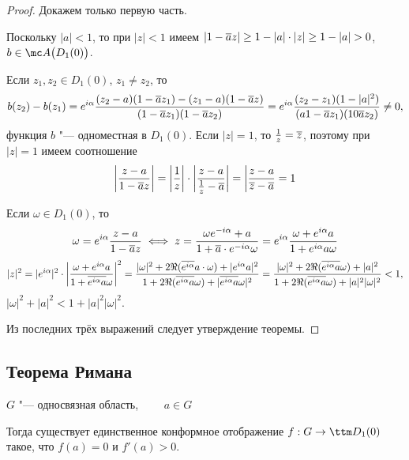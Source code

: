 \begin{proof}
	Докажем только первую часть.

	Поскольку $ |a| < 1 $, то при $ |z| < 1 $ имеем $ |1 - \overline az| \ge 1 - |a| \cdot |z| \ge 1 - |a| > 0 $, \ie $ b \in \mc A \big( D_1(0) \big) $.

	Если $ z_1, z_2 \in D_1(0) $, $ z_1 \ne z_2 $, то
	$$ b(z_2) - b(z_1) = e^{i\alpha} \frac{(z_2 - a)(1 - \overline a z_1) - (z_1 - a)(1 - \overline az)}{(1 - \overline az_1)(1 - \overline az_2)} = e^{i\alpha} \frac{(z_2 - z_1)(1 - |a|^2)}{(a1 - \overline az_1)(1 0 \overline az_2)} \ne 0, $$
	\ie функция $ b $ "--- одноместная в $ D_1(0) $. Если $ |z| = 1 $, то $ \frac1z = \overline z $, поэтому при $ |z| = 1 $ имеем соотношение
	$$ \bigg| \frac{z - a}{1 - \overline az} \bigg| = \bigg| \frac1z \bigg| \cdot \bigg| \frac{z - a}{\frac1z - \overline a} \bigg| = \bigg| \frac{z - a}{\overline z - \overline a} = 1 $$

	Если $ \omega \in D_1(0) $, то
	$$ \omega = e^{i\alpha} \frac{z - a}{1 - \overline az} \iff z = \frac{\omega e^{-i\alpha} + a}{1 + \overline a \cdot e^{-i\alpha}\omega} = e^{i\alpha} \frac{\omega + e^{i\alpha}a}{1 + e^{i\alpha}a\omega} $$
	$$ |z|^2 = |e^{i\alpha}|^2 \cdot \bigg| \frac{\omega + e^{i\alpha}a}{1 + \overline{e^{i\alpha}a}\omega } \bigg|^2 = \frac{|\omega|^2 + 2 \Re( \overline{e^{i\alpha}}a \cdot \omega) + |e^{i\alpha}a|^2}{1 + 2 \Re(\overline{e^{i\alpha}a}\omega) + |\overline{e^{i\alpha}a}\omega|^2} = \frac{|\omega|^2 + 2\Re(\overline{e^{i\alpha}a}\omega) + |a|^2}{1 + 2\Re(\overline{e^{i\alpha}a}\omega) + |a|^2|\omega|^2} < 1, $$
	\as $ |\omega|^2 + |a|^2 < 1 + |a|^2|\omega|^2 $.

	Из последних трёх выражений следует утверждение теоремы.
\end{proof}

\subsection{Теорема Римана}

\begin{theorem}
	$ G $ "--- односвязная область, $ \qquad a \in G $

	Тогда существует единственное конформное отображение $ f : G \to \ttm D_1(0) $ такое, что $ f(a) = 0 $ и $ f'(a) > 0 $.
\end{theorem}
